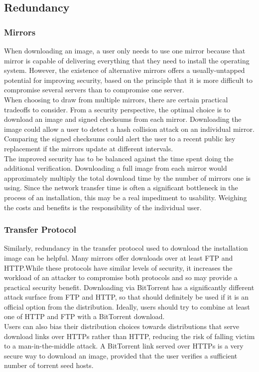 \documentclass[conference]{IEEEtran}
\begin{document}
\subsection{Redundancy\label{redundancy}}

\subsubsection{Mirrors}

When downloading an image, a user only needs to use one mirror because that mirror is
capable of delivering everything that they need to install the operating system. However,
the existence of alternative mirrors offers a usually-untapped potential for improving
security, based on the principle that it is more difficult to compromise several servers
than to compromise one server.\\
\indent When choosing to draw from multiple mirrors, there are
certain practical tradeoffs to consider. From a security perspective, the optimal choice
is to download an image and signed checksums from each mirror. Downloading
the image could allow a user to detect a hash collision attack on an individual mirror.
Comparing the signed checksums could alert the user to a recent public key replacement if
the mirrors update at different intervals.\\
\indent The improved security has to be balanced against the time spent doing the additional
verification. Downloading a full image from each mirror would approximately multiply the
total download time by the number of mirrors one is using. Since the network transfer time
is often a significant bottleneck in the process of an installation, this may be a real
impediment to usability. Weighing the costs and benefits is the responsibility of the
individual user.

\subsubsection{Transfer Protocol}

Similarly, redundancy in the transfer protocol used to download the installation image
can be helpful. Many mirrors offer downloads over at least FTP and HTTP.\@ While these
protocols have similar levels of security, it increases the workload of an attacker to
compromise both protocols and so may provide a practical security benefit. Downloading
via BitTorrent has a significantly different attack surface from FTP and HTTP, so that
should definitely be used if it is an official option from the distribution. Ideally,
users should try to combine at least one of HTTP and FTP with a BitTorrent download.\\
\indent Users can
also bias their distribution choices towards distributions that serve download links
over HTTPs rather than HTTP, reducing the risk of falling victim to a man-in-the-middle
attack. A BitTorrent link served over HTTPs is a very secure way to download an image,
provided that the user verifies a sufficient number of torrent seed hosts.
\end{document}
